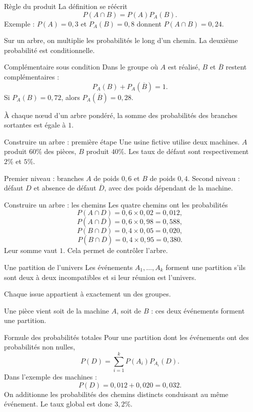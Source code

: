 \documentclass[aspectratio=169,12pt]{beamer}
\begin{document}
\renewcommand{\slidekind}{COMPRENDRE}
\begin{frame}[t,fragile]{Règle du produit}
La définition se réécrit\[\boxed{P(A\cap B)=P(A)P_A(B)}.\]Exemple : $P(A)=0,3$ et $P_A(B)=0,8$ donnent $P(A\cap B)=0,24$.\medskip\par Sur un arbre, on multiplie les probabilités le long d’un chemin. La deuxième probabilité est conditionnelle.
\end{frame}
\renewcommand{\slidekind}{COMPRENDRE}
\begin{frame}[t,fragile]{Complémentaire sous condition}
Dans le groupe où $A$ est réalisé, $B$ et $\overline B$ restent complémentaires :\[P_A(B)+P_A(\overline B)=1.\]Si $P_A(B)=0,72$, alors $P_A(\overline B)=0,28$.\medskip\par À chaque nœud d’un arbre pondéré, la somme des probabilités des branches sortantes est égale à $1$.
\end{frame}
\renewcommand{\slidekind}{MÉTHODE \& EXEMPLE}
\begin{frame}[t,fragile]{Construire un arbre : première étape}
Une usine fictive utilise deux machines. $A$ produit $60\%$ des pièces, $B$ produit $40\%$. Les taux de défaut sont respectivement $2\%$ et $5\%$.\medskip\par Premier niveau : branches $A$ de poids $0,6$ et $B$ de poids $0,4$. Second niveau : défaut $D$ et absence de défaut $\overline D$, avec des poids dépendant de la machine.
\end{frame}
\renewcommand{\slidekind}{COMPRENDRE}
\begin{frame}[t,fragile]{Construire un arbre : les chemins}
Les quatre chemins ont les probabilités\[P(A\cap D)=0,6\times0,02=0,012,\]\[P(A\cap\overline D)=0,6\times0,98=0,588,\]\[P(B\cap D)=0,4\times0,05=0,020,\]\[P(B\cap\overline D)=0,4\times0,95=0,380.\]Leur somme vaut $1$. Cela permet de contrôler l’arbre.
\end{frame}
\renewcommand{\slidekind}{COMPRENDRE}
\begin{frame}[t,fragile]{Une partition de l’univers}
Les événements $A_1,\ldots,A_k$ forment une partition s’ils sont deux à deux incompatibles et si leur réunion est l’univers.\medskip\par Chaque issue appartient à exactement un des groupes.\medskip\par Une pièce vient soit de la machine $A$, soit de $B$ : ces deux événements forment une partition.
\end{frame}
\renewcommand{\slidekind}{COMPRENDRE}
\begin{frame}[t,fragile]{Formule des probabilités totales}
Pour une partition dont les événements ont des probabilités non nulles,\[\boxed{P(D)=\sum_{i=1}^kP(A_i)P_{A_i}(D)}.\]Dans l’exemple des machines :\[P(D)=0,012+0,020=0,032.\]On additionne les probabilités des chemins distincts conduisant au même événement. Le taux global est donc $3,2\%$.
\end{frame}
\end{document}
